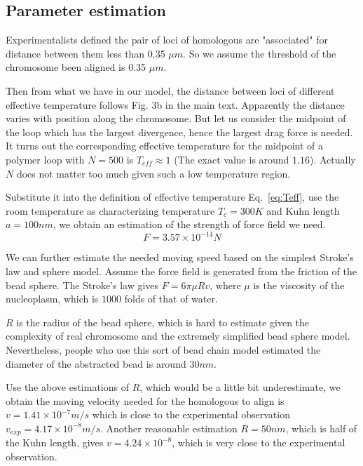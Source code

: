 \documentclass{article}
\newcommand{\blue}[1]{{\color{blue}{#1}}}
\begin{document}
\subsection{Parameter estimation}
\label{sub:estimation}
\blue{W: please ask V to go over this section. Calculations seem to be fine and I will double check before the final submission, but I think V might want to modify the ``logic'' of the parameter estimation.}
Experimentalists defined the pair of loci of homologous are "associated" for distance between them less than 0.35 $\mu m$\cite{Ding2004}. 
So we assume the threshold of the chromosome been aligned is 0.35 $\mu m$.

Then from what we have in our model, the distance between loci of different effective temperature follows Fig. 3b in the main text.
Apparently the distance varies with position along the chromosome. 
But let us consider the midpoint of the loop which has the largest divergence, hence the largest drag force is needed.
It turns out the corresponding effective temperature for the midpoint of a polymer loop with $N=500$ is $T_{eff}\approx 1$ (The exact value is around $1.16$). 
Actually $N$ does not matter too much given such a low temperature region. 

Substitute it into the definition of effective temperature Eq.~\ref{eq:Teff}, use the room temperature as characterizing temperature $T_c = 300K$ and Kuhn length $a = 100nm$, we obtain an estimation of the strength of force field we need.
\begin{equation}
	F = 3.57\times10^{-14} N
\end{equation}

We can further estimate the needed moving speed based on the simplest Stroke's law and sphere model. 
Assume the force field is generated from the friction of the bead sphere. 
The Stroke's law gives $F= 6\pi \mu R v$, where $\mu$ is the viscosity of the nucleoplasm, which is $1000$ folds of that of water.

$R$ is the radius of the bead sphere, which is hard to estimate given the complexity of real chromosome and the extremely simplified bead sphere model.
Nevertheless, people who use this sort of bead chain model estimated the diameter of the abstracted bead is around $30nm$\cite{Rosa2008}.

Use the above estimations of $R$, which would be a little bit underestimate, we obtain the moving velocity needed for the homologous to align is $v = 1.41\times10^{-7} m/s$ which is close to the experimental observation $v_{exp} = 4.17\times10^{-8}m/s$.
Another reasonable estimation $R=50nm$, which is half of the Kuhn length, gives $v = 4.24\times10^{-8}$, which is very close to the experimental observation.
\end{document}
